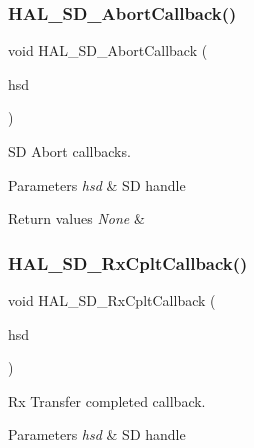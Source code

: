 \subsubsection{\texorpdfstring{HAL\_SD\_AbortCallback()}{HAL\_SD\_AbortCallback()}}
{\footnotesize\ttfamily void H\+A\+L\+\_\+\+S\+D\+\_\+\+Abort\+Callback (\begin{DoxyParamCaption}\item[{\mbox{\hyperlink{group___s_d___exported___types___group3_ga1f31eb64a86b0c740bb5c02fa4c9914d}{S\+D\+\_\+\+Handle\+Type\+Def}} $\ast$}]{hsd }\end{DoxyParamCaption})}



SD Abort callbacks. 


\begin{DoxyParams}{Parameters}
{\em hsd} & SD handle \\
\hline
\end{DoxyParams}

\begin{DoxyRetVals}{Return values}
{\em None} & \\
\hline
\end{DoxyRetVals}
\mbox{\label{group___s_d___exported___functions___group2_ga1720dc3a0e88b26e557ae63fad3a382d}} 
\subsubsection{\texorpdfstring{HAL\_SD\_RxCpltCallback()}{HAL\_SD\_RxCpltCallback()}}
{\footnotesize\ttfamily void H\+A\+L\+\_\+\+S\+D\+\_\+\+Rx\+Cplt\+Callback (\begin{DoxyParamCaption}\item[{\mbox{\hyperlink{group___s_d___exported___types___group3_ga1f31eb64a86b0c740bb5c02fa4c9914d}{S\+D\+\_\+\+Handle\+Type\+Def}} $\ast$}]{hsd }\end{DoxyParamCaption})}



Rx Transfer completed callback. 


\begin{DoxyParams}{Parameters}
{\em hsd} & SD handle \\
\hline
\end{DoxyParams}

